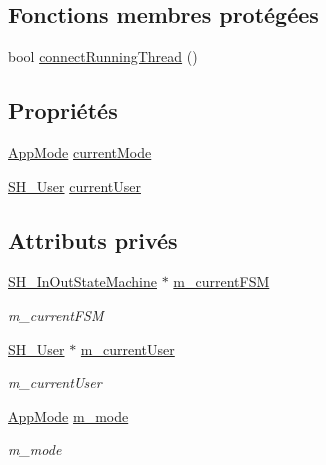 \subsection*{Fonctions membres protégées}
\begin{DoxyCompactItemize}
\item 
bool \hyperlink{classSH__ApplicationCore_a3a10c2d662707140340d7a827d119c8d}{connect\-Running\-Thread} ()
\end{DoxyCompactItemize}
\subsection*{Propriétés}
\begin{DoxyCompactItemize}
\item 
\hyperlink{classSH__ApplicationCore_a6b93b2f83a290305f282616eb2935899}{App\-Mode} \hyperlink{classSH__ApplicationCore_a5b51b2abe52d58a11a0a8bb2a95bdbd2}{current\-Mode}
\item 
\hyperlink{classSH__User}{S\-H\-\_\-\-User} \hyperlink{classSH__ApplicationCore_afe36b3fd891c706ff1458b2eb7d46c5f}{current\-User}
\end{DoxyCompactItemize}
\subsection*{Attributs privés}
\begin{DoxyCompactItemize}
\item 
\hyperlink{classSH__InOutStateMachine}{S\-H\-\_\-\-In\-Out\-State\-Machine} $\ast$ \hyperlink{classSH__ApplicationCore_a1088f3ba13abb8b3989cc0c325524232}{m\-\_\-current\-F\-S\-M}
\begin{DoxyCompactList}\small\item\em m\-\_\-current\-F\-S\-M \end{DoxyCompactList}\item 
\hyperlink{classSH__User}{S\-H\-\_\-\-User} $\ast$ \hyperlink{classSH__ApplicationCore_aa61720acee7e06e9828c570e8190304a}{m\-\_\-current\-User}
\begin{DoxyCompactList}\small\item\em m\-\_\-current\-User \end{DoxyCompactList}\item 
\hyperlink{classSH__ApplicationCore_a6b93b2f83a290305f282616eb2935899}{App\-Mode} \hyperlink{classSH__ApplicationCore_ac9587a451ab2294abe7a9eb738d93cb0}{m\-\_\-mode}
\begin{DoxyCompactList}\small\item\em m\-\_\-mode \end{DoxyCompactList}\end{DoxyCompactItemize}


